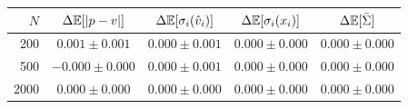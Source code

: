 \begin{tabular}{rcccc}
\hline
$N$ & $\Delta\mathbb{E}[|p-v|]$ & $\Delta\mathbb{E}[\sigma_i(\hat v_i)]$ & $\Delta\mathbb{E}[\sigma_i(x_i)]$ & $\Delta\mathbb{E}[\bar\Sigma]$ \\
\hline
200 & $0.001\pm0.001$ & $0.000\pm0.001$ & $0.000\pm0.000$ & $0.000\pm0.000$ \\
500 & $-0.000\pm0.000$ & $0.000\pm0.001$ & $0.000\pm0.000$ & $0.000\pm0.000$ \\
2000 & $0.000\pm0.000$ & $0.000\pm0.000$ & $0.000\pm0.000$ & $0.000\pm0.000$ \\
\hline
\end{tabular}
